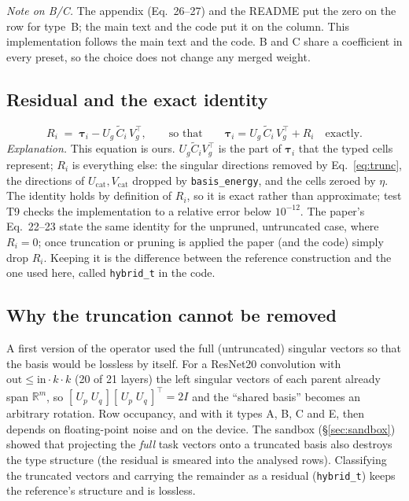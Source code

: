 \documentclass[11pt,a4paper]{article}
\newcommand{\tauv}{\boldsymbol{\tau}}
\newcommand{\Ug}{U_g}
\newcommand{\Vg}{V_g}
\newcommand{\Ct}{\tilde{C}}
\newcommand{\code}[1]{\texttt{#1}}
\begin{document}
\emph{Note on B/C.} The appendix (Eq.~26--27) and the README put the zero on the row for type~B; the main text and the code put it on the column. This implementation follows the main text and the code. B and C share a coefficient in every preset, so the choice does not change any merged weight.

\subsection{Residual and the exact identity}
\label{sec:residual}
\begin{equation}
R_i \;=\; \tauv_i - \Ug\,\Ct_i\,\Vg^{\top},
\qquad\text{so that}\qquad
\tauv_i = \Ug\,\Ct_i\,\Vg^{\top} + R_i \quad\text{exactly}.
\label{eq:identity}
\end{equation}
\emph{Explanation.} This equation is ours. $\Ug\Ct_i\Vg^{\top}$ is the part of $\tauv_i$ that the typed cells represent; $R_i$ is everything else: the singular directions removed by Eq.~\ref{eq:trunc}, the directions of $U_{\mathrm{cat}},V_{\mathrm{cat}}$ dropped by \code{basis\_energy}, and the cells zeroed by $\eta$. The identity holds by definition of $R_i$, so it is exact rather than approximate; test T9 checks the implementation to a relative error below $10^{-12}$. The paper's Eq.~22--23 state the same identity for the unpruned, untruncated case, where $R_i=0$; once truncation or pruning is applied the paper (and the code) simply drop $R_i$. Keeping it is the difference between the reference construction and the one used here, called \code{hybrid\_t} in the code.

\subsection{Why the truncation cannot be removed}
\label{sec:degenerate}
A first version of the operator used the full (untruncated) singular vectors so that the basis would be lossless by itself. For a ResNet20 convolution with $\mathrm{out}\le\mathrm{in}\cdot k\cdot k$ (20 of 21 layers) the left singular vectors of each parent already span $\mathbb{R}^{m}$, so $[\,U_p\;U_q\,][\,U_p\;U_q\,]^{\top}=2I$ and the ``shared basis'' becomes an arbitrary rotation. Row occupancy, and with it types A, B, C and E, then depends on floating-point noise and on the device. The sandbox (\S\ref{sec:sandbox}) showed that projecting the \emph{full} task vectors onto a truncated basis also destroys the type structure (the residual is smeared into the analysed rows). Classifying the truncated vectors and carrying the remainder as a residual (\code{hybrid\_t}) keeps the reference's structure and is lossless.
\end{document}
